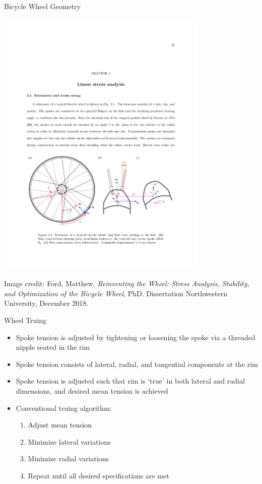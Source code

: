 \documentclass[mathserif]{beamer}
\begin{document}
\begin{frame}{Bicycle Wheel Geometry}
    \begin{center}
    	\includegraphics[width=4.0in]{fig_geometry.pdf}
    \end{center}
    \begin{block}{}
    {\tiny Image credit: Ford, Matthew, \emph{Reinventing the Wheel: Stress Analysis, Stability, and Optimization of the Bicycle Wheel}, PhD. Dissertation Northwestern University, December 2018.}
    \end{block}
\end{frame}

\begin{frame}{Wheel Truing}
	\begin{itemize}
        \item Spoke tension is adjusted by tightening or loosening the spoke via a threaded nipple seated in the rim
        \item Spoke tension consists of lateral, radial, and tangential components at the rim           
        \item Spoke tension is adjusted such that rim is `true' in both lateral and radial dimensions, and desired mean tension is achieved
        \item Conventional truing algorithm:
        \begin{enumerate}
            \item Adjust mean tension
            \item Minimize lateral variations
            \item Minimize radial variations
            \item Repeat until all desired specifications are met
        \end{enumerate}
	\end{itemize}
\end{frame}
\end{document}
